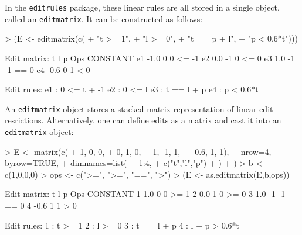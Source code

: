 \documentclass[11pt, fleqn, a4paper]{article}
\begin{document}
In the {\tt editrules} package, these linear rules are all stored in a single object, called an
{\tt editmatrix}. It can be constructed as follows:
\begin{Schunk}
\begin{Sinput}
> (E <- editmatrix(c(
+     "t >= 1", 
+     "l >= 0",
+     "t == p + l",
+     "p < 0.6*t")))
\end{Sinput}
\begin{Soutput}
Edit matrix:
      t  l  p Ops CONSTANT
e1 -1.0  0  0  <=       -1
e2  0.0 -1  0  <=        0
e3  1.0 -1 -1  ==        0
e4 -0.6  0  1   <        0

Edit rules:
e1 : 0 <= t + -1 
e2 : 0 <= l 
e3 : t == l + p 
e4 : p < 0.6*t  
\end{Soutput}
\end{Schunk}
An {\tt editmatrix} object stores a stacked matrix representation of linear
edit resrictions. Alternatively, one can define edits as a matrix and
cast it into an {\tt editmatrix} object:
\begin{Schunk}
\begin{Sinput}
> E <- matrix(c(
+      1,   0, 0,
+      0,   1, 0,
+      1,  -1,-1,
+     -0.6, 1, 1),
+     nrow=4,
+     byrow=TRUE,
+     dimnames=list(
+         1:4,
+         c("t","l","p")
+     )
+ )
> b <- c(1,0,0,0)
> ops <- c(">=", ">=", "==", ">")
> (E <- as.editmatrix(E,b,ops))
\end{Sinput}
\begin{Soutput}
Edit matrix:
     t  l  p Ops CONSTANT
1  1.0  0  0  >=        1
2  0.0  1  0  >=        0
3  1.0 -1 -1  ==        0
4 -0.6  1  1   >        0

Edit rules:
1 : t >= 1 
2 : l >= 0 
3 : t == l + p 
4 : l + p > 0.6*t  
\end{Soutput}
\end{Schunk}
\end{document}
